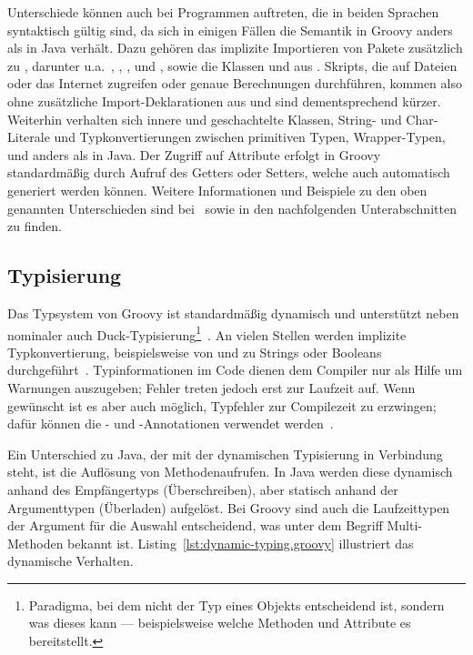 \documentclass[a4paper]{article}
\begin{document}
Unterschiede können auch bei Programmen auftreten, die in beiden Sprachen syntaktisch gültig sind, da sich in einigen Fällen die Semantik in Groovy anders als in Java verhält.
Dazu gehören das implizite Importieren von Pakete zusätzlich zu , darunter u.a.~, , ,  und , sowie die Klassen  und  aus .
Skripts, die auf Dateien oder das Internet zugreifen oder genaue Berechnungen durchführen, kommen also ohne zusätzliche Import-Deklarationen aus und sind dementsprechend kürzer.
Weiterhin verhalten sich innere und geschachtelte Klassen, String- und Char-Literale und Typkonvertierungen zwischen primitiven Typen, Wrapper-Typen,  und  anders als in Java.
Der Zugriff auf Attribute erfolgt in Groovy standardmäßig durch Aufruf des Getters oder Setters, welche auch automatisch generiert werden können.
Weitere Informationen und Beispiele zu den oben genannten Unterschieden sind bei~\cite[Abs~3.2.]{groovy-lang:documentation} sowie in den nachfolgenden Unterabschnitten zu finden.

\subsection{Typisierung}\label{subsec:typisierung}

Das Typsystem von Groovy ist standardmäßig dynamisch und unterstützt neben nominaler auch Duck-Typisierung\footnote{Paradigma, bei dem nicht der Typ eines Objekts entscheidend ist, sondern was dieses kann --- beispielsweise welche Methoden und Attribute es bereitstellt.}~\cite[Abs.~1.6.6.]{groovy-lang:documentation}.
An vielen Stellen werden implizite Typkonvertierung, beispielsweise von und zu Strings oder Booleans durchgeführt~\cite[Abs.~1.6.3.]{groovy-lang:documentation}.
Typinformationen im Code dienen dem Compiler nur als Hilfe um Warnungen auszugeben; Fehler treten jedoch erst zur Laufzeit auf.
Wenn gewünscht ist es aber auch möglich, Typfehler zur Compilezeit zu erzwingen; dafür können die - und -Annotationen verwendet werden~\cite[Abs.~1.6.6.]{groovy-lang:documentation}.

Ein Unterschied zu Java, der mit der dynamischen Typisierung in Verbindung steht, ist die Auflösung von Methodenaufrufen.
In Java werden diese dynamisch anhand des Empfängertyps (Überschreiben), aber statisch anhand der Argumenttypen (Überladen) aufgelöst.
Bei Groovy sind auch die Laufzeittypen der Argument für die Auswahl entscheidend, was unter dem Begriff Multi-Methoden bekannt ist.
Listing~\ref{lst:dynamic-typing.groovy} illustriert das dynamische Verhalten.
\end{document}
